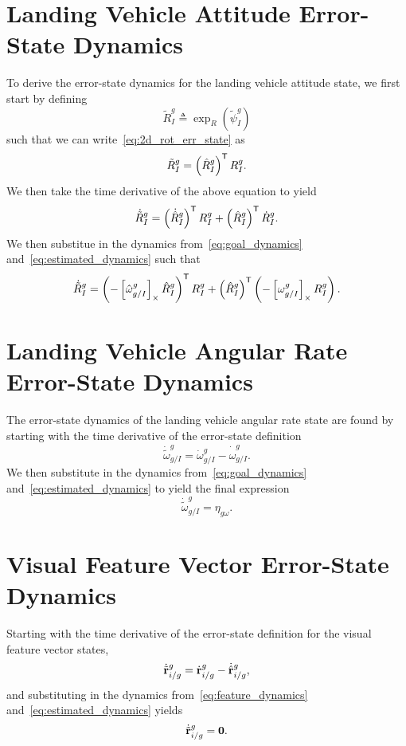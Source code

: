 \section{Landing Vehicle Attitude Error-State Dynamics}
To derive the error-state dynamics for the landing vehicle attitude state, we
first start by defining
\begin{equation}
  \tilde{R}_I^g \triangleq \exp_R \left( \tilde{\psi}_I^g \right)
\end{equation}
such that we can write~\eqref{eq:2d_rot_err_state} as
\begin{equation}
  \tilde{R}_I^g = \left( \hat{R}_I^g \right)^{\mathsf{T}} R_I^g.
\end{equation}
We then take the time derivative of the above equation to yield
\begin{equation}
  \dot{\tilde{R}}_I^g = \left( \dot{\hat{R}}_I^g \right)^{\mathsf{T}} R_I^g + 
  \left( \hat{R}_I^g \right)^{\mathsf{T}} \dot{R}_I^g.
\end{equation}
We then substitue in the dynamics from~\eqref{eq:goal_dynamics}
and~\eqref{eq:estimated_dynamics} such that
\begin{equation}
  \dot{\tilde{R}}_I^g = \left( -\left[  \hat{\omega}_{g/I}^g  \right]_{\times} \hat{R}_I^g \right)^{\mathsf{T}} R_I^g + 
  \left( \hat{R}_I^g \right)^{\mathsf{T}} \left( -\left[  \omega_{g/I}^g  \right]_{\times}
    R_I^g
\right).
\end{equation}

\section{Landing Vehicle Angular Rate Error-State Dynamics}
The error-state dynamics of the landing vehicle angular rate state are found by
starting with the time derivative of the error-state definition
\begin{equation}
  \dot{\tilde{\omega}}_{g/I}^g = \dot{\omega}_{g/I}^g -
  \dot{\hat{\omega}}_{g/I}^g.
\end{equation}
We then substitute in the dynamics from~\eqref{eq:goal_dynamics}
and~\eqref{eq:estimated_dynamics} to yield the final expression
\begin{equation}
  \dot{\tilde{\omega}}_{g/I}^g = \eta_{g\omega}. 
\end{equation}

\section{Visual Feature Vector Error-State Dynamics}
Starting with the time derivative of the error-state definition for the visual
feature vector states,
\begin{equation}
  \dot{\tilde{\boldsymbol{\mathrm{r}}}}_{i/g}^g = \dot{\boldsymbol{\mathrm{r}}}_{i/g}^g  -
  \dot{\hat{\boldsymbol{\mathrm{r}}}}_{i/g}^g,
\end{equation}
and substituting in the dynamics from~\eqref{eq:feature_dynamics}
and~\eqref{eq:estimated_dynamics} yields
\begin{equation}
  \dot{\tilde{\boldsymbol{\mathrm{r}}}}_{i/g}^g = \boldsymbol{\mathrm{0}}.
\end{equation}

